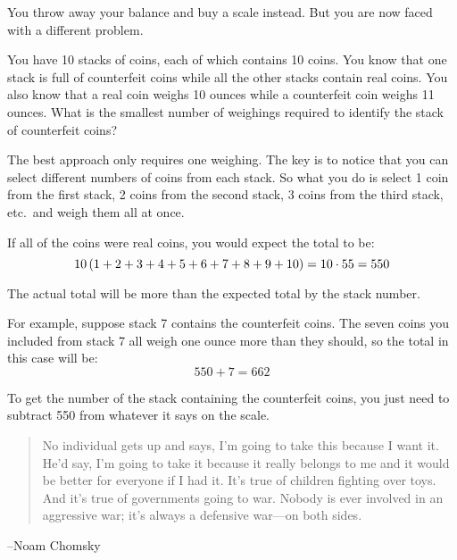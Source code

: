 \documentclass[letterpaper]{exam}
\begin{document}
\begin{questions}
\begin{solution}
          \end{solution}
  
        \question{}
  
          You throw away your balance and buy a scale instead.  But you are now faced with a different
          problem.  
  
          You have 10 stacks of coins, each of which contains 10 coins.  You know that one stack is full
          of counterfeit coins while all the other stacks contain real coins.  You also know that a real
          coin weighs 10 ounces while a counterfeit coin weighs 11 ounces.  What is the smallest number
          of weighings required to identify the stack of counterfeit coins?
  
          \begin{solution}
  
            The best approach only requires one weighing.  The key is to notice that you can select
            different numbers of coins from each stack.  So what you do is select 1 coin from the
            first stack, 2 coins from the second stack, 3 coins from the third stack, etc.\ and weigh
            them all at once.
  
            If all of the coins were real coins, you would expect the total to be: 
            \[ 
              10 \del{ 1 + 2 + 3 + 4 + 5 + 6 + 7 + 8 + 9 + 10 }  = 10 \cdot 55 = 550 
            \]
  
            The actual total will be more than the expected total by the stack number.  
  
            For example, suppose stack 7 contains the counterfeit coins.  The seven coins you included from
            stack 7 all weigh one ounce more than they should, so the total in this case will be: 
            \[ 
              550 + 7 = 662 
            \]
  
            To get the number of the stack containing the counterfeit coins, you just need to subtract 550
            from whatever it says on the scale.
  
          \end{solution}
  
    \end{questions}

    \ifprintanswers{}
    \else
        \vspace{6 cm}
        \begin{quote}
            \begin{em}
                No individual gets up and says, I'm going to take this because I want it. He'd say, I'm
                going to take it because it really belongs to me and it would be better for everyone if I
                had it. It's true of children fighting over toys. And it's true of governments going to war.
                Nobody is ever involved in an aggressive war; it's always a defensive war---on both sides.
            \end{em}
        \end{quote}
        \hspace{1 cm} --Noam Chomsky
    \fi
\end{document}

